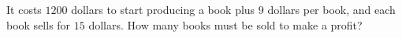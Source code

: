 It costs $1200$ dollars to start producing a book plus $9$ dollars per book, and each book sells for $15$ dollars. How many books must be sold to make a profit?
